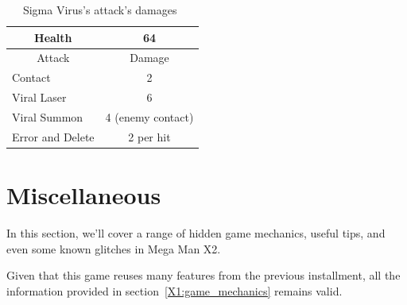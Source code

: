 \begin{table}[htp]
	\centering
	\begin{tabular}[h]{l c}
		\toprule
		\multicolumn{1}{c}{Health}  & 64\\
		\midrule
		\multicolumn{1}{c}{Attack} & \multicolumn{1}{c}{Damage}\\
		Contact & 2 \\
		Viral Laser & 6\\
		Viral Summon & 4 (enemy contact)\\
		Error and Delete & 2 per hit\\
		\bottomrule
	\end{tabular}
	\caption{Sigma Virus's attack's damages~\cite{wiki:Neo_sigma}}
\end{table}

\section{Miscellaneous}\label{X2:misc} %
In this section, we'll cover a range of hidden game mechanics, useful tips, and even some known glitches in Mega Man X2.

Given that this game reuses many features from the previous installment, all the information provided in section~\ref{X1:game_mechanics} remains valid.

